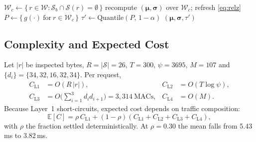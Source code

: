 \documentclass[conference]{IEEEtran}
\begin{document}
\begin{algorithm}[H]
\SetAlgoLined
{}
$\mathcal{W}_c \leftarrow \{\,r\in\mathcal{W} : \mathcal{S}_b\cap\mathcal{S}(r)=\emptyset\,\}$\;
recompute $(\boldsymbol{\mu},\boldsymbol{\sigma})$ over $\mathcal{W}_c$; refresh
\eqref{eq:relz}\;
$P \leftarrow \{\,g(\cdot)\ \textrm{for}\ r\in\mathcal{W}_c\,\}$
$\tau' \leftarrow \mathrm{Quantile}(P,\,1-\alpha)$\;
\Return $(\boldsymbol{\mu},\boldsymbol{\sigma},\tau')$\;
\caption{Calibration with admission gates}
\label{alg:calib}
\end{algorithm}

\subsection{Complexity and Expected Cost}
\label{sec:complexity}
Let $|r|$ be inspected bytes, $R=|\mathcal{S}|=26$, $T=300$, $\psi=3695$, $M=107$ and
$\{d_i\}=\{34,32,16,32,34\}$. Per request,
\begin{align}
C_{\text{L1}} &= O(R\,|r|), & C_{\text{L2}} &= O(T\log\psi),\\
C_{\text{L3}} &= O\!\Big(\textstyle\sum_{i=1}^{3} d_i d_{i+1}\Big)=3{,}314\ \text{MACs},
& C_{\text{L4}} &= O(M).
\end{align}
Because Layer~1 short-circuits, expected cost depends on traffic composition:
\begin{equation}
\mathbb{E}[C]=\rho\,C_{\text{L1}}+(1-\rho)\!
\left(C_{\text{L1}}+C_{\text{L2}}+C_{\text{L3}}+C_{\text{L4}}\right),
\label{eq:expcost}
\end{equation}
with $\rho$ the fraction settled deterministically. At $\rho=0.30$ the mean falls from
5.43\,ms to 3.82\,ms.
\end{document}
